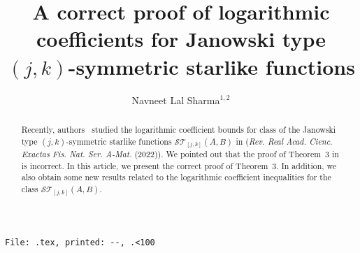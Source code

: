 \documentclass[12pt]{amsart}
\numberwithin{equation}{section}
\theoremstyle{definition}
\numberwithin{equation}{section}
\newcounter{minutes}\setcounter{minutes}{\time}
\newcounter{hours}\setcounter{hours}{\time}
\begin{document}
\title[Logarithmic coefficients for Janowski type $(j,k)$-symmetric starlike functions]
{A correct proof of logarithmic coefficients for Janowski type $(j,k)$-symmetric starlike functions
}


\author[Navneet Lal Sharma]{Navneet Lal Sharma$^{1,2}$}
\address{Navneet Lal Sharma,
$^1 $Department of Mathematics, 
National Rail and Transportation Institute (NRTI) Vadodara.
NAIR Campus, Lalbaug, Vadodara-390004, Gujarat. India }

\address{$^2$ School of Mathematical Science, Universiti Sains of Malaysia, Penang, Malaysia. 
}




\begin{abstract}
Recently, authors~\cite{HG22} studied the logarithmic coefficient bounds for class of the Janowski type $(j,k)$-symmetric starlike functions $\mathcal{ST}_{[j,k]}(A,B)$ in ({\em Rev. Real Acad. Cienc. Exactas Fis. Nat. Ser. A-Mat.} (2022)). We pointed out that the proof of Theorem~3 in \cite{HG22} is incorrect. 
In this article, we present the correct proof of Theorem~3. 
In addition, we also obtain some new results related to the logarithmic coefficient inequalities for the class $\mathcal{ST}_{[j,k]}(A,B)$.

\end{abstract}

\maketitle \pagestyle{myheadings} 


\begin{center}
\texttt{File:~\jobname .tex, printed: \number\day-\number\month-\number\year,
\thehours.\ifnum\theminutes<10{0}\fi\theminutes}
\end{center}
\end{document}
